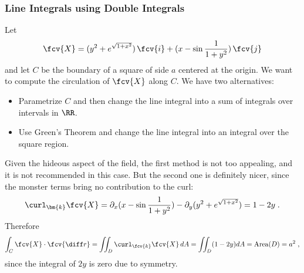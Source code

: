\begin{frame}
\small
  \frametitle{Line Integrals using Double Integrals}

  Let
%
$$\fcv{X} = (y^2+e^{\sqrt{1+x^2}}) \, \fcv{i} + (x-\sin{\frac{1}{1+y^2}})\, \fcv{j}$$
%
and let $C$ be the boundary of a square of side $a$ centered at the origin. We want to compute the circulation of $\fcv{X}$ along $C$. We have two alternatives:

\begin{itemize}
  \item Parametrize $C$ and then change the line integral into a sum of integrals over intervals in $\RR$.
  \item Use Green's Theorem and change the line integral into an integral over the square region.
\end{itemize}

Given the hideous aspect of the field, the first method is not too appealing, and it is not recommended in this case. But the second one is definitely nicer, since the monster terms bring no contribution to the curl:
%
$$\curl_{\bm{k}} \fcv{X} = \partial_x (x-\sin{\frac{1}{1+y^2}}) - \partial_y (y^2+e^{\sqrt{1+x^2}}) = 1-2y \; .$$
%
Therefore
%
$$\int_C \fcv{X} \cdot \fcv{\diff r} = \int\!\!\!\int_D \curl_{\fcv{k}} \fcv{X} \, dA = \int\!\!\!\int_D (1-2y) dA = \text{Area}(D) = a^2\; ,$$
%
since the integral of $2y$ is zero due to symmetry.
\end{frame}
